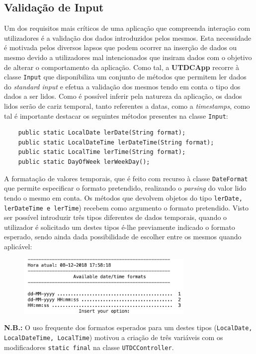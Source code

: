 \documentclass{article}
\begin{document}
\subsection{Validação de Input}
Um dos requisitos mais críticos de uma aplicação que compreenda interação com utilizadores é a validação dos dados introduzidos pelos mesmos. Esta necessidade
é motivada pelos diversos lapsos que podem ocorrer na inserção de dados ou mesmo devido a utilizadores mal intencionados que insiram dados com o objetivo
de alterar o comportamento da aplicação. Como tal, a \textbf{UTDCApp} recorre à classe \texttt{Input} que disponibiliza um conjunto de métodos que permitem 
ler dados do \textit{standard input} e efetua a validação dos mesmos tendo em conta o tipo dos dados a ser lidos. 
Como é possível inferir pela natureza da aplicação, os dados lidos serão de cariz temporal, tanto referentes a datas, como a \textit{timestamps}, como tal
é importante destacar os seguintes métodos presentes na classe \texttt{Input}:

\begin{verbatim}
    public static LocalDate lerDate(String format); 
    public static LocalDateTime lerDateTime(String format); 
    public static LocalTime lerTime(String format); 
    public static DayOfWeek lerWeekDay(); 
\end{verbatim}

A formatação de valores temporais, que é feito com recurso à classe \texttt{DateFormat} que permite especificar o formato pretendido, 
realizando o \textit{parsing} do valor lido tendo o mesmo em conta. 
Os métodos que devolvem objetos do tipo \texttt{lerDate, lerDateTime e lerTime}) recebem como argumento o formato pretendido.
Visto ser possível introduzir três tipos diferentes de dados temporais, quando o utilizador é solicitado um destes tipos
é-lhe previamente indicado o formato esperado, sendo ainda dada possibilidade de escolher entre os mesmos quando aplicável:

\begin{figure}[H]
    \centering
    \includegraphics[width=8.5cm]{date_formats.png}
\end{figure}

\textbf{N.B.:} O uso frequente dos formatos esperados para um destes tipos (\texttt{LocalDate, LocalDateTime, LocalTime}) motivou a criação de três variáveis 
com os modificadores \texttt{static final} na classe \texttt{UTDCController}.
\end{document}
